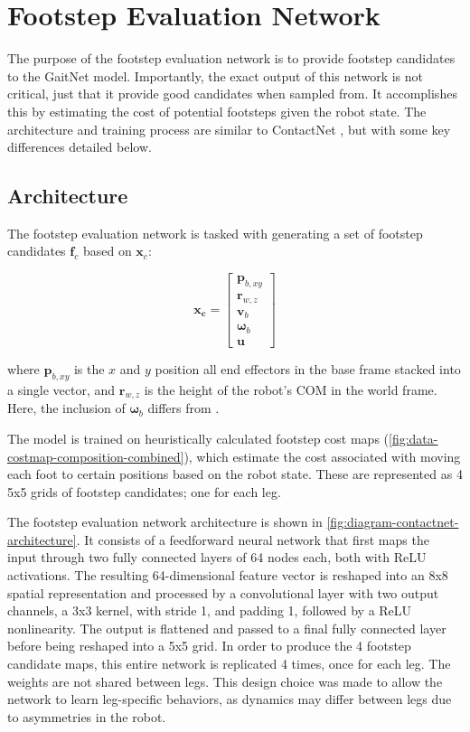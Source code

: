 \section{Footstep Evaluation Network}

The purpose of the footstep evaluation network is to provide
footstep candidates to the GaitNet model. Importantly,
the exact output of this network is not critical, just that
it provide good candidates when sampled from. It accomplishes
this by estimating the cost of potential footsteps given the
robot state. The architecture and training process are similar to
ContactNet \cite{bratta_contactnet_2024}, but with some key differences
detailed below.

\subsection{Architecture}
\label{sec:contactnet-architecture}

The footstep evaluation network is tasked with generating a set of
footstep candidates $\mathbf f_c$ based on $\mathbf x_c$:

\[
  \mathbf{x_c} =
  \begin{bmatrix}
    \mathbf p_{b,xy} \\
    \mathbf r_{w,z} \\
    \mathbf v_b \\
    \mathbf \omega_b \\
    \mathbf u
  \end{bmatrix}
\]

where
$\mathbf p_{b,xy}$ is the $x$ and $y$ position all end effectors in
the base frame stacked into a single vector, and
$\mathbf r_{w,z}$ is the height of the robot's COM in the world frame.
Here, the inclusion of $\mathbf \omega_b$ differs from
\cite{bratta_contactnet_2024}.

The model is trained on heuristically calculated footstep
cost maps (\autoref{fig:data-costmap-composition-combined}), which estimate
the cost associated with moving each foot to certain positions based on the
robot state. These are represented as 4 5x5 grids of footstep candidates;
one for each leg.

The footstep evaluation network architecture is shown in
\autoref{fig:diagram-contactnet-architecture}. It consists of a
feedforward neural
network that first maps the input through two fully connected layers
of 64 nodes each, both with ReLU activations. The resulting 64-dimensional
feature vector is reshaped into an 8x8 spatial representation and
processed by a convolutional layer with two output channels, a
3x3 kernel, with stride 1, and padding 1, followed by a ReLU
nonlinearity. The output is flattened and passed to a final
fully connected layer before being reshaped into a 5x5 grid. In order to
produce the 4 footstep candidate maps, this entire network is replicated
4 times, once for each leg. The weights are not shared between legs.
This design choice was made to allow the network to learn
leg-specific behaviors,
as dynamics may differ between legs due to asymmetries in the robot.


